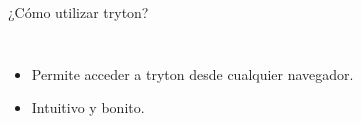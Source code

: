 \begin{frame}[fragile=singleslide]{¿Cómo utilizar tryton?}
\begin{columns}
            \begin{itemize}
                \item Permite acceder a tryton desde cualquier navegador.
                \item Intuitivo y bonito.
            \end{itemize}
        \end{columns}

	\end{frame}

%
%
